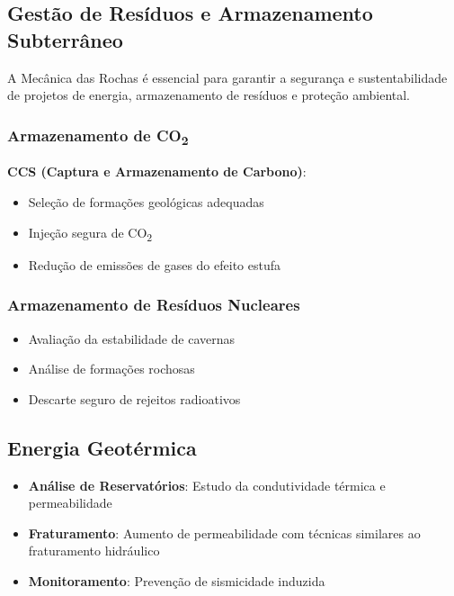 \documentclass[12pt,a4paper,twoside]{book}
\begin{document}
\subsection{Gestão de Resíduos e Armazenamento Subterrâneo}

A Mecânica das Rochas é essencial para garantir a segurança e sustentabilidade de projetos de 
energia, armazenamento de resíduos e proteção ambiental.

\subsubsection{Armazenamento de CO\textsubscript{2}}

\textbf{CCS (Captura e Armazenamento de Carbono)}:
\begin{itemize}
    \item Seleção de formações geológicas adequadas
    \item Injeção segura de CO\textsubscript{2}
    \item Redução de emissões de gases do efeito estufa
\end{itemize}

\subsubsection{Armazenamento de Resíduos Nucleares}

\begin{itemize}
    \item Avaliação da estabilidade de cavernas
    \item Análise de formações rochosas
    \item Descarte seguro de rejeitos radioativos
\end{itemize}

\subsection{Energia Geotérmica}

\begin{itemize}
    \item \textbf{Análise de Reservatórios}: Estudo da condutividade térmica e permeabilidade
    \item \textbf{Fraturamento}: Aumento de permeabilidade com técnicas similares ao fraturamento hidráulico
    \item \textbf{Monitoramento}: Prevenção de sismicidade induzida
\end{itemize}
\end{document}
